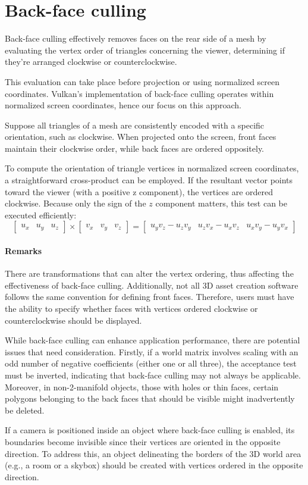 \section{Back-face culling}

Back-face culling effectively removes faces on the rear side of a mesh by evaluating the vertex order of triangles concerning the viewer, determining if they're arranged clockwise or counterclockwise.

This evaluation can take place before projection or using normalized screen coordinates.
Vulkan's implementation of back-face culling operates within normalized screen coordinates, hence our focus on this approach.

Suppose all triangles of a mesh are consistently encoded with a specific orientation, such as clockwise.
When projected onto the screen, front faces maintain their clockwise order, while back faces are ordered oppositely.

To compute the orientation of triangle vertices in normalized screen coordinates, a straightforward cross-product can be employed.
If the resultant vector points toward the viewer (with a positive z component), the vertices are ordered clockwise. 
Because only the sign of the $z$ component matters, this test can be executed efficiently:
\[\begin{bmatrix}
    u_x & u_y & u_z
\end{bmatrix} \times \begin{bmatrix}
    v_x & v_y & v_z
\end{bmatrix}=\begin{bmatrix}
    u_y{v}_z - u_z{v}_y & u_z{v}_x - u_x{v}_z & u_x{v}_y -u_y{v}_x
\end{bmatrix}\]

\paragraph*{Remarks}
There are transformations that can alter the vertex ordering, thus affecting the effectiveness of back-face culling. 
Additionally, not all 3D asset creation software follows the same convention for defining front faces. 
Therefore, users must have the ability to specify whether faces with vertices ordered clockwise or counterclockwise should be displayed.

While back-face culling can enhance application performance, there are potential issues that need consideration. 
Firstly, if a world matrix involves scaling with an odd number of negative coefficients (either one or all three), the acceptance test must be inverted, indicating that back-face culling may not always be applicable. 
Moreover, in non-2-manifold objects, those with holes or thin faces, certain polygons belonging to the back faces that should be visible might inadvertently be deleted.

If a camera is positioned inside an object where back-face culling is enabled, its boundaries become invisible since their vertices are oriented in the opposite direction. 
To address this, an object delineating the borders of the 3D world area (e.g., a room or a skybox) should be created with vertices ordered in the opposite direction.